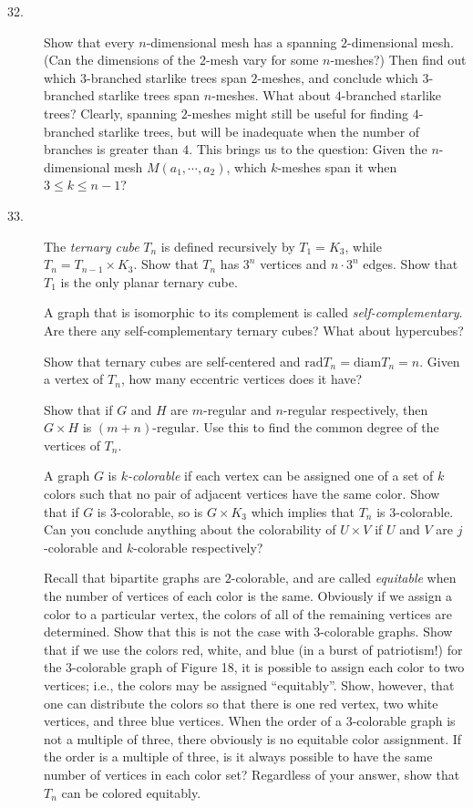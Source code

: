 \documentclass{article}
\begin{document}
\begin{description}
\item[32.] Show that every $n$-dimensional mesh has a spanning $2$-dimensional mesh. (Can the dimensions of the $2$-mesh vary for some $n$-meshes?) Then find out which $3$-branched starlike trees span $2$-meshes, and conclude which $3$-branched starlike trees span $n$-meshes. What about $4$-branched starlike trees? Clearly, spanning $2$-meshes might still be useful for finding $4$-branched starlike trees, but will be inadequate when the number of branches is greater than $4$. This brings us to the question: Given the $n$-dimensional mesh $M(a_1,\cdots,a_2)$, which $k$-meshes span it when $3 \leq k \leq n-1$?

\item[33.] The \emph{ternary cube} $T_n$ is defined recursively by $T_1 = K_3$, while $T_n = T_{n-1} \times K_3$. Show that $T_n$ has $3^n$ vertices and $n \cdot 3^n$ edges. Show that $T_1$ is the only planar ternary cube.

  A graph that is isomorphic to its complement is called \emph{self-complementary}. Are there any self-complementary ternary cubes? What about hypercubes?

  Show that ternary cubes are self-centered and $\text{rad} T_n = \text{diam} T_n = n$. Given a vertex of $T_n$, how many eccentric vertices does it have?

  Show that if $G$ and $H$ are $m$-regular and $n$-regular respectively, then $G \times H$ is $(m+n)$-regular. Use this to find the common degree of the vertices of $T_n$.

  A graph $G$ is \emph{$k$-colorable} if each vertex can be assigned one of a set of $k$ colors such that no pair of adjacent vertices have the same color. Show that if $G$ is $3$-colorable, so is $G \times K_3$ which implies that $T_n$ is $3$-colorable. Can you conclude anything about the colorability of $U \times V$ if $U$ and $V$ are $j$-colorable and $k$-colorable respectively?

  Recall that bipartite graphs are $2$-colorable, and are called \emph{equitable} when the number of vertices of each color is the same. Obviously if we assign a color to a particular vertex, the colors of all of the remaining vertices are determined. Show that this is not the case with $3$-colorable graphs. Show that if we use the colors red, white, and blue (in a burst of patriotism!) for the $3$-colorable graph of Figure 18, it is possible to assign each color to two vertices; i.e., the colors may be assigned ``equitably''. Show, however, that one can distribute the colors so that there is one red vertex, two white vertices, and three blue vertices. When the order of a $3$-colorable graph is not a multiple of three, there obviously is no equitable color assignment. If the order is a multiple of three, is it always possible to have the same number of vertices in each color set? Regardless of your answer, show that $T_n$ can be colored equitably.


\end{description}
\end{document}
